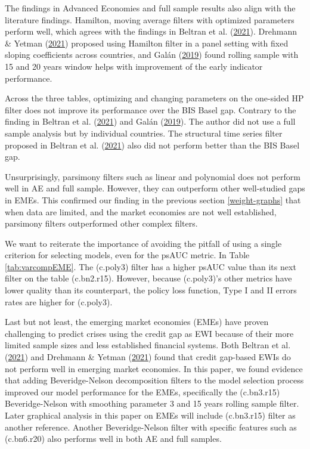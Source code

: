 \documentclass[
  12pt,
]{article}
\begin{document}
The findings in Advanced Economies and full sample results also align with the literature findings. Hamilton, moving average filters with optimized parameters perform well, which agrees with the findings in Beltran et al. (\protect\hyperlink{ref-beltran_optimizing_2021}{2021}). Drehmann \& Yetman (\protect\hyperlink{ref-drehmann_which_2021}{2021}) proposed using Hamilton filter in a panel setting with fixed sloping coefficients across countries, and Galán (\protect\hyperlink{ref-galan_measuring_2019}{2019}) found rolling sample with 15 and 20 years window helps with improvement of the early indicator performance.

Across the three tables, optimizing and changing parameters on the one-sided HP filter does not improve its performance over the BIS Basel gap. Contrary to the finding in Beltran et al. (\protect\hyperlink{ref-beltran_optimizing_2021}{2021}) and Galán (\protect\hyperlink{ref-galan_measuring_2019}{2019}). The author did not use a full sample analysis but by individual countries. The structural time series filter proposed in Beltran et al. (\protect\hyperlink{ref-beltran_optimizing_2021}{2021}) also did not perform better than the BIS Basel gap.

Unsurprisingly, parsimony filters such as linear and polynomial does not perform well in AE and full sample. However, they can outperform other well-studied gaps in EMEs. This confirmed our finding in the previous section \ref{weight-graphs} that when data are limited, and the market economies are not well established, parsimony filters outperformed other complex filters.

We want to reiterate the importance of avoiding the pitfall of using a single criterion for selecting models, even for the psAUC metric. In Table \ref{tab:varcompEME}. The (c.poly3) filter has a higher psAUC value than its next filter on the table (c.bn2.r15). However, because (c.poly3)'s other metrics have lower quality than its counterpart, the policy loss function, Type I and II errors rates are higher for (c.poly3).

Last but not least, the emerging market economies (EMEs) have proven challenging to predict crises using the credit gap as EWI because of their more limited sample sizes and less established financial systems. Both Beltran et al. (\protect\hyperlink{ref-beltran_optimizing_2021}{2021}) and Drehmann \& Yetman (\protect\hyperlink{ref-drehmann_which_2021}{2021}) found that credit gap-based EWIs do not perform well in emerging market economies. In this paper, we found evidence that adding Beveridge-Nelson decomposition filters to the model selection process improved our model performance for the EMEs, specifically the (c.bn3.r15) Beveridge-Nelson with smoothing parameter 3 and 15 years rolling sample filter. Later graphical analysis in this paper on EMEs will include (c.bn3.r15) filter as another reference. Another Beveridge-Nelson filter with specific features such as (c.bn6.r20) also performs well in both AE and full samples.
\end{document}
